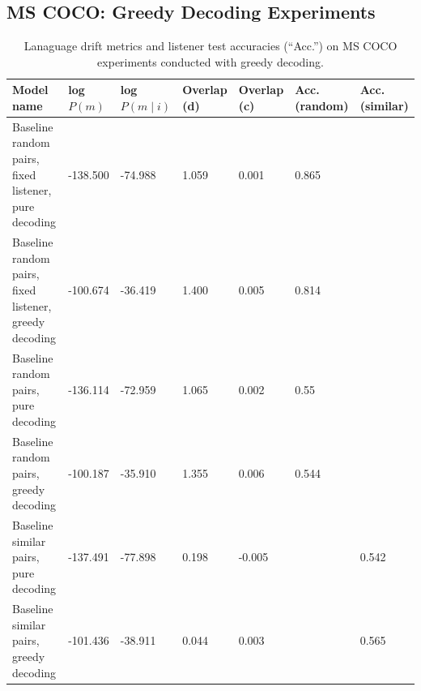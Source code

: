 \subsection{MS COCO: Greedy Decoding Experiments}
\begin{table}[]
	\begin{tabularx}{\linewidth}{|X|l|l|X|X|X|X|}
		\hline
			\textbf{Model name}                                    & \textbf{log $P(m)$} & \textbf{log $P(m \mid i)$} & \textbf{Overlap (d)} & \textbf{Overlap (c)} & \textbf{Acc. (random)} & \textbf{Acc. (similar)} \\ \hline
			 Baseline random pairs, fixed listener, pure decoding   &     -138.500         &         -74.988               &       1.059            &      0.001               &       0.865          &                \\ \hline
			 Baseline random pairs, fixed listener, greedy decoding   &     -100.674     &         -36.419              &       1.400       &      0.005             &       0.814          &                \\ \hline
			 Baseline random pairs, pure decoding   & -136.114        &      -72.959            &       1.065          &      0.002               &       0.55          &                \\ \hline
			 Baseline random pairs, greedy decoding   &-100.187      &    -35.910            &       1.355          &      0.006            &       0.544         &                \\ \hline
			 Baseline similar pairs, pure decoding   &     -137.491& -77.898    & 0.198    &   -0.005    &            &  0.542        \\ \hline
			 Baseline similar pairs, greedy decoding   &   -101.436  &      -38.911        &     0.044   &     0.003     &            &     0.565           \\ \hline
			 
	\end{tabularx}
\caption{\label{tab:coco_greedy}Lanaguage drift metrics and listener test accuracies (``Acc.'') on MS COCO experiments conducted with greedy decoding.}
\end{table}

